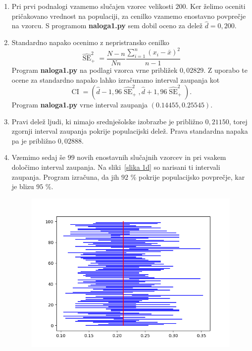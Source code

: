 \documentclass{article}
\DeclareMathOperator{\se}{SE}
\DeclareMathOperator{\ci}{CI}
\begin{document}
\begin{enumerate}[label=\alph*)]
    \item Pri prvi podnalogi vzamemo slučajen vzorec velikosti $200$. Ker želimo
        oceniti pričakovano vrednost na populaciji, za cenilko vzamemo enostavno
        povprečje na vzorcu. S programom \textbf{naloga1.py} sem dobil oceno za
        delež $\hat{d} = 0{,}200$.
    \item Standardno napako ocenimo z nepristransko cenilko
        \[
            \widehat{\se}_+^2 = \frac{N - n}{N n} \frac{\sum_{i=1}^{n} (x_i -
            \bar{x})^2}{n - 1}
        \]
        Program \textbf{naloga1.py} na podlagi vzorca vrne približek
        $0{,}02829$. Z uporabo te ocene za standardno napako lahko izračunamo
        interval zaupanja kot
        \[
            \ci = (\hat{d} - 1{,}96 \widehat{\se}_+^2, \hat{d} + 1{,}96
            \widehat{\se}_+^2).
        \]
        Program \textbf{naloga1.py} vrne interval zaupanja $(0.14455, 0.25545)$.
    \item Pravi delež ljudi, ki nimajo srednješolske izobrazbe je približno
        $0{,}21150$, torej zgornji interval zaupanja pokrije populacijski delež.
        Prava standardna napaka pa je približno $0{,}02888$.
    \item Vzemimo sedaj še $99$ novih enostavnih slučajnih vzorcev in pri vsakem
        določimo interval zaupanja. Na sliki~\ref{slika 1d} so narisani ti
        intervali zaupanja. Program izračuna, da jih $92$ \% pokrije
        populacijsko povprečje, kar je blizu $95$ \%.
        \begin{figure}[H]
            \centering
            \includegraphics[scale=0.5]{1d.png}

\end{figure}
\end{enumerate}
\end{document}

